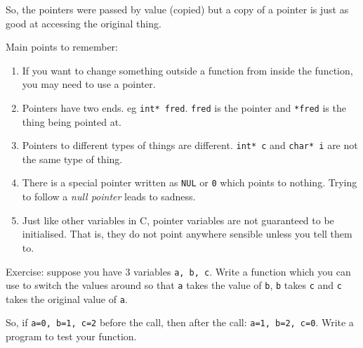 So, the pointers were passed by value (copied) but a copy of a pointer is just as good at accessing the original thing.

Main points to remember:
\begin{enumerate}
 \item If you want to change something outside a function from inside the function, you may need to use a pointer.
 \item Pointers have two ends. eg \lstinline!int* fred!.   \texttt{fred} is the pointer and \texttt{*fred} is the thing 
 being pointed at.
 \item Pointers to different types of things are different. \texttt{int* c} and \texttt{char* i} are not the same type of thing.
 \item There is a special pointer written as \texttt{NUL} or \texttt{0} which points to nothing.
 Trying to follow a \emph{null pointer} leads to sadness.
 \item Just like other variables in C, pointer variables are not guaranteed to be initialised.
 That is, they do not point anywhere sensible unless you tell them to.
\end{enumerate}


Exercise: suppose you have 3 variables \texttt{a, b, c}.
Write a function which you can use to switch the values around so that 
\texttt{a} takes the value of \texttt{b}, \texttt{b} takes \texttt{c}
and \texttt{c} takes the original value of \texttt{a}.

So, if \lstinline{a=0, b=1, c=2} before the call, then after the call:
\lstinline{a=1, b=2, c=0}.
Write a program to test your function.



